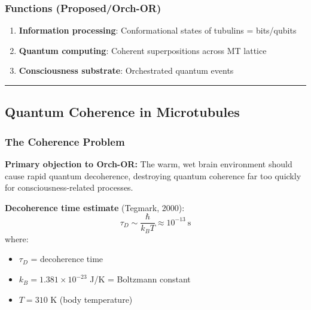 \subsubsection{Functions
(Proposed/Orch-OR)}\label{functions-proposedorch-or}

\begin{enumerate}
\def\labelenumi{\arabic{enumi}.}
\setcounter{enumi}{4}
\tightlist
\item
  \textbf{Information processing}: Conformational states of tubulins =
  bits/qubits
\item
  \textbf{Quantum computing}: Coherent superpositions across MT lattice
\item
  \textbf{Consciousness substrate}: Orchestrated quantum events
\end{enumerate}

\begin{center}\rule{0.5\linewidth}{0.5pt}\end{center}

\subsection{Quantum Coherence in
Microtubules}\label{quantum-coherence-in-microtubules}

\subsubsection{The Coherence Problem}\label{the-coherence-problem}

\begin{warningbox}
\textbf{Primary objection to Orch-OR:} The warm, wet brain environment should cause rapid quantum decoherence, destroying quantum coherence far too quickly for consciousness-related processes.
\end{warningbox}

\textbf{Decoherence time estimate} (Tegmark, 2000):
\begin{equation}
\label{eq:decoherence-time}
\tau_D \sim \frac{\hbar}{k_B T} \approx 10^{-13}~\text{s}
\end{equation}
where:
\begin{itemize}
\item $\tau_D$ = decoherence time
\item $k_B = 1.381 \times 10^{-23}$ J/K = Boltzmann constant
\item $T = 310$ K (body temperature)
\end{itemize}

